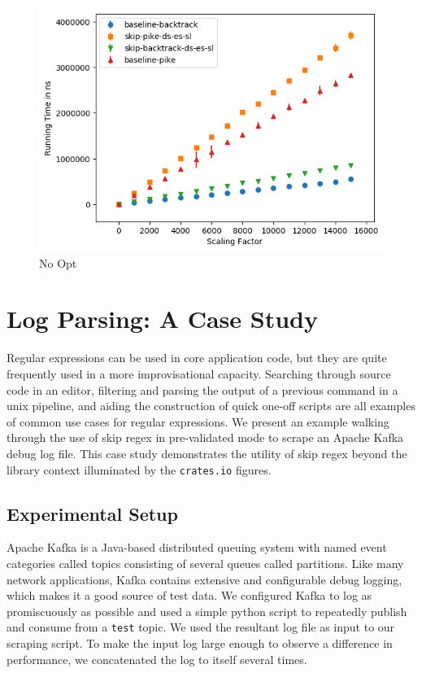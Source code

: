 \begin{figure}
\label{fig:justtwo:branch}
\caption{No Opt}
\includegraphics{resources/justtwo-branch.png}
\end{figure}

\section{Log Parsing: A Case Study}

Regular expressions can be used in core application code, but they
are quite frequently used in a more improvisational capacity.
Searching through source code in an editor, filtering and parsing
the output of a previous command in a unix pipeline, and aiding
the construction of quick one-off scripts are all examples of
common use cases for regular expressions. We present an example
walking through the use of skip regex in pre-validated mode
to scrape an Apache Kafka debug log file. This case study
demonstrates the utility of skip regex beyond the library context
illuminated by the \verb'crates.io' figures.

\subsection{Experimental Setup}

Apache Kafka is a Java-based distributed queuing system with
named event categories called topics consisting of several
queues called partitions. Like many network applications,
Kafka contains extensive and configurable debug logging,
which makes it a good source of test data. We configured
Kafka to log as promiscuously as possible and used a simple
python script to repeatedly publish and consume from a 
\verb'test' topic. We used the resultant log file as input
to our scraping script. To make the input log large enough
to observe a difference in performance, we concatenated the
log to itself several times.

